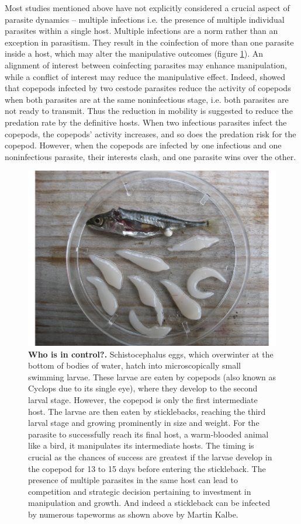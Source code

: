 \documentclass[a4paper]{scrartcl}
\begin{document}
Most studies mentioned above have not explicitly considered a crucial aspect of parasite dynamics -- multiple infections \citep{kalbe:JFB:2002} i.e. the presence of multiple individual parasites within a single host.
Multiple infections are a norm rather than an exception in parasitism. 
They result in the coinfection of more than one parasite inside a host, which may alter the manipulative outcomes (figure \ref{fig:empirical}). 
An alignment of interest between coinfecting parasites may enhance manipulation, while a conflict of interest may reduce the manipulative effect. 
Indeed, \cite{Hafer:2015gl} showed that copepods infected by two cestode parasites reduce the activity of copepods when both parasites are at the same noninfectious stage, i.e. both parasites are not ready to transmit. 
Thus the reduction in mobility is suggested to reduce the predation rate by the definitive hosts. 
When two infectious parasites infect the copepods, the copepods' activity increases, and so does the predation risk for the copepod. 
However, when the copepods are infected by one infectious and one noninfectious parasite, their interests clash, and one parasite wins over the other. 

\begin{figure}[ht!]
\captionsetup{format=plain}
\centering
\includegraphics[width=0.75\columnwidth]{Figures/Sept_10_ 101.pdf}
\caption{\textbf{Who is in control?.}
Schistocephalus eggs, which overwinter at the bottom of bodies of water, hatch into microscopically small swimming larvae. 
These larvae are eaten by copepods (also known as Cyclops due to its single eye), where they develop to the second larval stage. 
However, the copepod is only the first intermediate host. 
The larvae are then eaten by sticklebacks, reaching the third larval stage and growing prominently in size and weight. 
For the parasite to successfully reach its final host, a warm-blooded animal like a bird, it manipulates its intermediate hosts. 
The timing is crucial as the chances of success are greatest if the larvae develop in the copepod for 13 to 15 days before entering the stickleback. 
The presence of multiple parasites in the same host can lead to competition and strategic decision pertaining to investment in manipulation and growth.
And indeed a stickleback can be infected by numerous tapeworms as shown above by Martin Kalbe.
}
\label{fig:empirical}
\end{figure}
\end{document}
